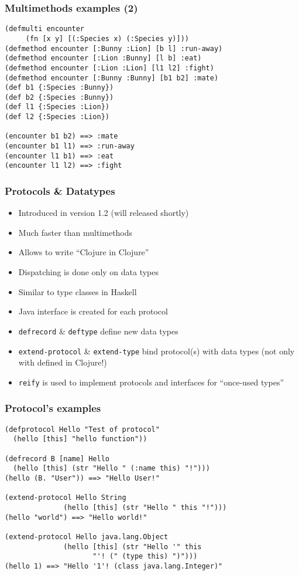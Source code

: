 \begin{frame}[fragile]
  \frametitle{Multimethods examples (2)}
\begin{lstlisting}
(defmulti encounter 
     (fn [x y] [(:Species x) (:Species y)]))
(defmethod encounter [:Bunny :Lion] [b l] :run-away)
(defmethod encounter [:Lion :Bunny] [l b] :eat)
(defmethod encounter [:Lion :Lion] [l1 l2] :fight)
(defmethod encounter [:Bunny :Bunny] [b1 b2] :mate)
(def b1 {:Species :Bunny})
(def b2 {:Species :Bunny})
(def l1 {:Species :Lion})
(def l2 {:Species :Lion})

(encounter b1 b2) ==> :mate
(encounter b1 l1) ==> :run-away
(encounter l1 b1) ==> :eat
(encounter l1 l2) ==> :fight
\end{lstlisting}
\end{frame}


\begin{frame}[t]
  \frametitle{Protocols \& Datatypes}
  \begin{itemize}
  \item Introduced in version 1.2 (will released shortly)
  \item Much faster than multimethods
  \item Allows to write ``Clojure in Clojure''
  \item Dispatching is done only on data types
  \item Similar to type classes in Haskell
  \item Java interface is created for each protocol
  \item \texttt{defrecord} \& \texttt{deftype} define new data types
  \item \texttt{extend-protocol} \& \texttt{extend-type} bind protocol(s) with data types
    (not only with defined in Clojure!)
  \item \texttt{reify} is used to implement protocols and interfaces for ``once-used
    types''
  \end{itemize}
\end{frame}

\begin{frame}[fragile]
  \frametitle{Protocol's examples}
\begin{lstlisting}
(defprotocol Hello "Test of protocol"
  (hello [this] "hello function"))

(defrecord B [name] Hello
  (hello [this] (str "Hello " (:name this) "!")))
(hello (B. "User")) ==> "Hello User!"

(extend-protocol Hello String
              (hello [this] (str "Hello " this "!")))
(hello "world") ==> "Hello world!"

(extend-protocol Hello java.lang.Object
              (hello [this] (str "Hello '" this 
                     "'! (" (type this) ")")))
(hello 1) ==> "Hello '1'! (class java.lang.Integer)"
\end{lstlisting}
\end{frame}

